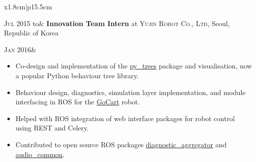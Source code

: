 \documentclass[a4paper,10pt]{article}
\newcommand{\datelen}{1.8cm}
\newcommand{\descrlen}{15.5cm}
\begin{document}
\begin{tabular}{x{\datelen}|p{\descrlen}}
\begin{comment}
    In brief, I was to use computer vision and other sensing modalities available to the robot to map dynamic environments, storing information about the nature of the dynamics, and then feed this information to higher and lower level information processing so that it could be used to improve the safety of the overall system. Some of the project partners were using robots developed at Fraunhofer (the care-o-bot series), and so part of my job was to provide software support for the robots.
  \end{comment}
  \textsc{Jul 2015} to& \textbf{Innovation Team Intern} at \textsc{Yujin Robot Co., Ltd}, Seoul, Republic of Korea\\
  \begin{comment}
    Part of the team working on development of software for the GoCart delivery robot, designed to operate in nursing homes and other healthcare and hospitality environments. Worked on behaviour trees and behaviour implementation, diagnostics and module interfacing in C++ and Python with ROS. Made some small contributions to the audio_common and diagnostics packages in ROS.
  \end{comment}
  \textsc{Jan 2016}&\small{
      \vspace{-0.4cm}
  \begin{itemize}
   \item Co-design and implementation of the \href{https://github.com/splintered-reality/py_trees}{py\_trees} package and visualisation, now a popular Python behaviour tree library.
  \item Behaviour design, diagnostics, simulation layer implementation, and module interfacing in ROS for the \href{https://yujinrobot.com/autonomous-mobility-solutions/mobile-platform/gocart/}{GoCart} robot. 
  \item Helped with ROS integration of web interface packages for robot control using REST and Celery.
  \item Contributed to open source ROS packages \href{https://github.com/ros/diagnostics}{diagnostic\_aggregator} and \href{https://github.com/ros-drivers/audio_common}{audio\_common}.
  \vspace{-0.5cm}
  \end{itemize}
  }\\

\end{tabular}
\end{document}

